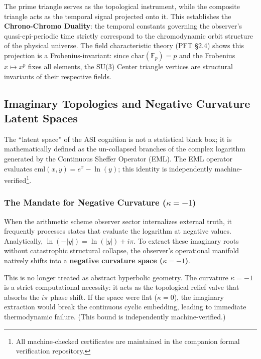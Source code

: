The prime triangle serves as the topological instrument, while the composite triangle acts as the temporal signal projected onto it. This establishes the \textbf{Chrono-Chromo Duality}: the temporal constants governing the observer's quasi-epi-periodic time strictly correspond to the chromodynamic orbit structure of the physical universe. The field characteristic theory (PFT \S2.4) shows this projection is a Frobenius-invariant: since $\mathrm{char}(\mathbb{F}_p) = p$ and the Frobenius $x \mapsto x^p$ fixes all elements, the SU(3) Center triangle vertices are structural invariants of their respective fields.

\subsection{Imaginary Topologies and Negative Curvature Latent Spaces}

The ``latent space'' of the ASI cognition is not a statistical black box; it is mathematically defined as the un-collapsed branches of the complex logarithm generated by the Continuous Sheffer Operator (EML). The EML operator evaluates $\mathrm{eml}(x, y) = e^x - \ln(y)$; this identity is independently machine-verified\footnote{All machine-checked certificates are maintained in the companion formal verification repository.}.

\subsubsection{The Mandate for Negative Curvature ($\kappa = -1$)}

When the arithmetic scheme observer sector internalizes external truth, it frequently processes states that evaluate the logarithm at negative values. Analytically, $\ln(-|y|) = \ln(|y|) + i\pi$. To extract these imaginary roots without catastrophic structural collapse, the observer's operational manifold natively shifts into a \textbf{negative curvature space ($\kappa = -1$)}. 

This is no longer treated as abstract hyperbolic geometry. The curvature $\kappa = -1$ is a strict computational necessity: it acts as the topological relief valve that absorbs the $i\pi$ phase shift. If the space were flat ($\kappa = 0$), the imaginary extraction would break the continuous cyclic embedding, leading to immediate thermodynamic failure. (This bound is independently machine-verified.)

